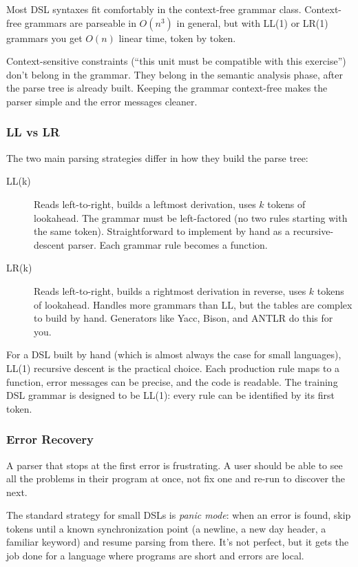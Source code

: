 Most DSL syntaxes fit comfortably in the context-free grammar class. Context-free grammars
are parseable in $O(n^3)$ in general, but with LL(1) or LR(1) grammars you get $O(n)$ linear time, token by token.

Context-sensitive constraints (``this unit must be compatible with this exercise'') don't
belong in the grammar. They belong in the semantic analysis phase, after the parse tree
is already built. Keeping the grammar context-free makes the parser simple and the error
messages cleaner.

\subsubsection{LL vs LR}

The two main parsing strategies differ in how they build the parse tree:

\begin{description}
  \item[LL(k)] Reads left-to-right, builds a leftmost derivation, uses $k$ tokens of
    lookahead. The grammar must be left-factored (no two rules starting with the same
    token). Straightforward to implement by hand as a recursive-descent parser. Each
    grammar rule becomes a function.
  \item[LR(k)] Reads left-to-right, builds a rightmost derivation in reverse, uses $k$
    tokens of lookahead. Handles more grammars than LL, but the tables are complex to
    build by hand. Generators like Yacc, Bison, and ANTLR do this for you.
\end{description}

For a DSL built by hand (which is almost always the case for small languages), LL(1)
recursive descent is the practical choice. Each production rule maps to a function, error
messages can be precise, and the code is readable. The training DSL grammar is designed
to be LL(1): every rule can be identified by its first token.

\subsubsection{Error Recovery}

A parser that stops at the first error is frustrating. A user should be able to see all
the problems in their program at once, not fix one and re-run to discover the next.

The standard strategy for small DSLs is \emph{panic mode}: when an error is found, skip
tokens until a known synchronization point (a newline, a new day header, a familiar
keyword) and resume parsing from there. It's not perfect, but it gets the job done for
a language where programs are short and errors are local.

